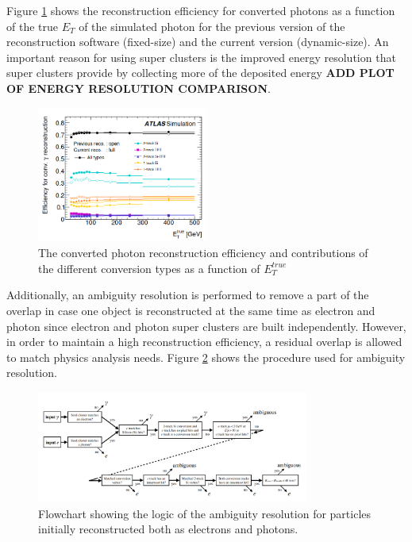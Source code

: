 Figure \ref{fig:chap2:Objects:Egamma:Gamma:Conv:Reco:Eff} shows the reconstruction efficiency for converted photons as a function of the true $E_T$ of the simulated photon for the previous version of the reconstruction software (fixed-size) and the current version (dynamic-size). An important reason for using super clusters is the improved energy resolution that super clusters provide by collecting more of the deposited energy \textbf{ADD PLOT OF ENERGY RESOLUTION COMPARISON}.
\begin{figure}[htbp]
    \centering
    \includegraphics[width=0.5\textwidth]{Ch2/Img/Photon_conv_Reco_Eff.png}
    \caption{The converted photon reconstruction efficiency and contributions of the different conversion types as a function of $E^{true}_T$}
    \label{fig:chap2:Objects:Egamma:Gamma:Conv:Reco:Eff}
\end{figure}

Additionally, an ambiguity resolution is performed to remove a part of the overlap in case one object is reconstructed at the same time as electron and photon since electron and photon super clusters are built independently. However, in order to maintain a high reconstruction efficiency, a residual overlap is allowed to match physics analysis needs. Figure \ref{fig:chap2:Objects:Egamma:Ambg} shows the procedure used for ambiguity resolution. 
\begin{figure}[htbp]
    \centering
    \includegraphics[width=0.8\textwidth]{Ch2/Img/Ambiguity.png}
    \caption{Flowchart showing the logic of the ambiguity resolution for particles initially reconstructed both as electrons and photons.}
    \label{fig:chap2:Objects:Egamma:Ambg}
\end{figure}

